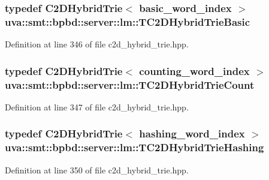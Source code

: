 \subsubsection[{T\+C2\+D\+Hybrid\+Trie\+Basic}]{\setlength{\rightskip}{0pt plus 5cm}typedef {\bf C2\+D\+Hybrid\+Trie}$<$ {\bf basic\+\_\+word\+\_\+index} $>$ {\bf uva\+::smt\+::bpbd\+::server\+::lm\+::\+T\+C2\+D\+Hybrid\+Trie\+Basic}}\label{namespaceuva_1_1smt_1_1bpbd_1_1server_1_1lm_a96890f7df15f6df7def061b4cebb16bb}


Definition at line 346 of file c2d\+\_\+hybrid\+\_\+trie.\+hpp.

\hypertarget{namespaceuva_1_1smt_1_1bpbd_1_1server_1_1lm_a8e12ef7ca924b2c5fd7f20236fe08dc5}{}
\subsubsection[{T\+C2\+D\+Hybrid\+Trie\+Count}]{\setlength{\rightskip}{0pt plus 5cm}typedef {\bf C2\+D\+Hybrid\+Trie}$<$ {\bf counting\+\_\+word\+\_\+index} $>$ {\bf uva\+::smt\+::bpbd\+::server\+::lm\+::\+T\+C2\+D\+Hybrid\+Trie\+Count}}\label{namespaceuva_1_1smt_1_1bpbd_1_1server_1_1lm_a8e12ef7ca924b2c5fd7f20236fe08dc5}


Definition at line 347 of file c2d\+\_\+hybrid\+\_\+trie.\+hpp.

\hypertarget{namespaceuva_1_1smt_1_1bpbd_1_1server_1_1lm_ac2bdab4ce215be43afe07de8390077e3}{}
\subsubsection[{T\+C2\+D\+Hybrid\+Trie\+Hashing}]{\setlength{\rightskip}{0pt plus 5cm}typedef {\bf C2\+D\+Hybrid\+Trie}$<$ {\bf hashing\+\_\+word\+\_\+index} $>$ {\bf uva\+::smt\+::bpbd\+::server\+::lm\+::\+T\+C2\+D\+Hybrid\+Trie\+Hashing}}\label{namespaceuva_1_1smt_1_1bpbd_1_1server_1_1lm_ac2bdab4ce215be43afe07de8390077e3}


Definition at line 350 of file c2d\+\_\+hybrid\+\_\+trie.\+hpp.

